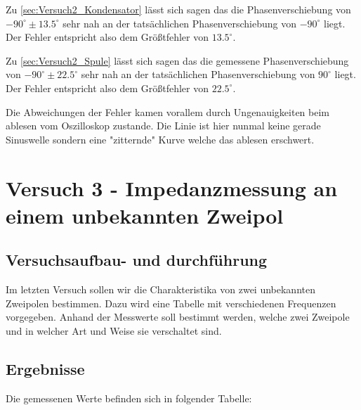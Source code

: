              \noindent Zu \ref{sec:Versuch2_Kondensator} lässt sich sagen das die Phasenverschiebung von $-90^{\circ} \pm 13.5^{\circ}$ sehr nah an der tatsächlichen Phasenverschiebung von $-90^{\circ}$ liegt. Der Fehler entspricht also dem Größtfehler von $13.5^{\circ}$.

             \noindent Zu \ref{sec:Versuch2_Spule} lässt sich sagen das die gemessene Phasenverschiebung von $-90^{\circ} \pm 22.5^{\circ}$ sehr nah an der tatsächlichen Phasenverschiebung von $90^{\circ}$ liegt. Der Fehler entspricht also dem Größtfehler von $22.5^{\circ}$. 

             \noindent Die Abweichungen der Fehler kamen vorallem durch Ungenauigkeiten beim ablesen vom Oszilloskop zustande. Die Linie ist hier nunmal keine gerade Sinuswelle sondern eine "zitternde" Kurve welche das ablesen erschwert. 

\section{Versuch 3 - Impedanzmessung an einem unbekannten Zweipol}
    
    \subsection{Versuchsaufbau- und durchführung}

        Im letzten Versuch sollen wir die Charakteristika von zwei unbekannten Zweipolen bestimmen. Dazu wird eine Tabelle mit verschiedenen Frequenzen vorgegeben. Anhand der Messwerte soll bestimmt werden, welche zwei Zweipole und in welcher Art und Weise sie verschaltet sind.

    \subsection{Ergebnisse}
    
        Die gemessenen Werte befinden sich in folgender Tabelle:


